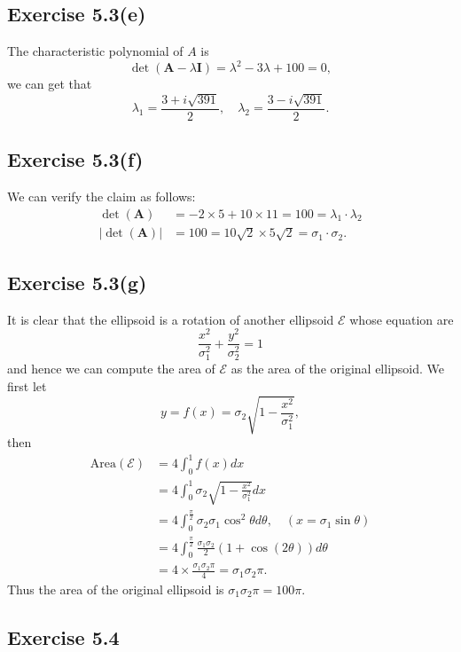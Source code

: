 \documentclass{article}
\begin{document}
\subsection{Exercise 5.3(e)}
The characteristic polynomial of $A$ is
$$
\det(\bm{A} - \lambda \bm{I}) = \lambda^2 - 3\lambda + 100 = 0,
$$
we can get that
$$
\lambda_1 = \frac{3 + i\sqrt{391}}{2}, \quad \lambda_2 = \frac{3 -i\sqrt{391}}{2}.
$$
\subsection{Exercise 5.3(f)}
We can verify the claim as follows:
$$
\begin{aligned}
\det(\bm{A}) &= -2\times 5 + 10 \times 11 = 100 = \lambda_1 \cdot \lambda_2 \\
|\det(\bm{A})| &= 100 = 10\sqrt{2} \times 5\sqrt{2} = \sigma_1 \cdot \sigma_2 .
\end{aligned}
$$
\subsection{Exercise 5.3(g)}
It is clear that the ellipsoid is a rotation of another ellipsoid $\mathcal{E}$ whose equation are
$$
\frac{x^2}{\sigma_1^2} + \frac{y^2}{\sigma_2^2} = 1
$$
and hence we can compute the area of $\mathcal{E}$ as the area of the original ellipsoid. We first let
$$
y = f(x) = \sigma_2 \sqrt{1 - \frac{x^2}{\sigma_1^2}},
$$
then
$$
\begin{aligned}
\mathrm{Area}(\mathcal{E}) &= 4 \int_{0}^1 f(x) dx \\
&= 4 \int_{0}^1 \sigma_2 \sqrt{1 - \frac{x^2}{\sigma_1^2}} dx \\
&= 4 \int_{0}^{\frac{\pi}{2}} \sigma_2\sigma_1 \cos^2 \theta d\theta, \quad (x = \sigma_1 \sin \theta) \\
& = 4 \int_{0}^{\frac{\pi}{2}} \frac{\sigma_1 \sigma_2}{2}(1+ \cos (2\theta)) d\theta \\
& = 4 \times \frac{\sigma_1 \sigma_2\pi}{4} = \sigma_1 \sigma_2 \pi.
\end{aligned}
$$
Thus the area of the original ellipsoid is $\sigma_1 \sigma_2 \pi = 100 \pi$.

\subsection{Exercise 5.4}
  
\end{document}
